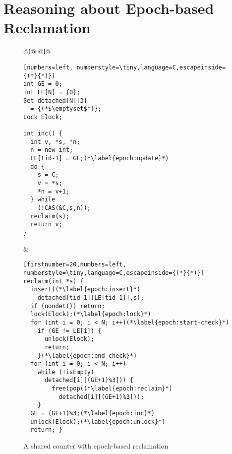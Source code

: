 
\section{Reasoning about Epoch-based Reclamation}\label{app:epoch}

\newcommand{\GE}{\texttt{GE}}
\newcommand{\LE}{\texttt{LE}}
\newcommand{\Elock}{\texttt{Elock}}

\begin{figure}[t]
\begin{tabular}{@{\qquad \qquad}l@{\qquad}|@{\qquad \qquad}l@{}}
{\figfontsize
\begin{lstlisting}[numbers=left, numberstyle=\tiny,language=C,escapeinside={(*}{*)}]
int GE = 0;
int LE[N] = {0};
Set detached[N][3]
  = {(*$\emptyset$*)};
Lock Elock;

int inc() {
  int v, *s, *n;
  n = new int;
  LE[tid-1] = GE;(*\label{epoch:update}*)
  do {
    s = C;
    v = *s;
    *n = v+1;
  } while
    (!CAS(&C,s,n));
  reclaim(s);
  return v;
}
\end{lstlisting}}
&
{\figfontsize
\begin{lstlisting}[firstnumber=20,numbers=left, numberstyle=\tiny,language=C,escapeinside={(*}{*)}]
reclaim(int *s) {
  insert((*\label{epoch:insert}*)
    detached[tid-1][LE[tid-1]],s);
  if (nondet()) return;
  lock(Elock);(*\label{epoch:lock}*)
  for (int i = 0; i < N; i++)(*\label{epoch:start-check}*)
    if (GE != LE[i]) {
      unlock(Elock);
      return;
    }(*\label{epoch:end-check}*)
  for (int i = 0; i < N; i++)
    while (!isEmpty(
      detached[i][(GE+1)%3])) {
        free(pop((*\label{epoch:reclaim}*)
          detached[i][(GE+1)%3]));
    }
  GE = (GE+1)%3;(*\label{epoch:inc}*)
  unlock(Elock);(*\label{epoch:unlock}*)
  return; }
\end{lstlisting}
}
\end{tabular}
\caption{\small A shared counter with epoch-based reclamation}
\label{fig:epoch}
\end{figure}




